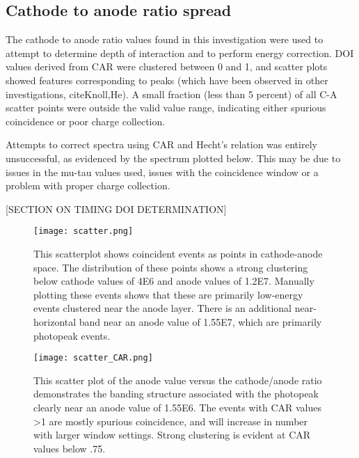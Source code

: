 \subsection{Cathode to anode ratio spread}

The cathode to anode ratio values found in this investigation were used to attempt to determine depth of interaction and to perform energy correction. DOI values derived from CAR were clustered between 0 and 1, and scatter plots showed features corresponding to peaks (which have been observed in other investigations, cite{Knoll,He}). A small fraction (less than 5 percent) of all C-A scatter points were outside the valid value range, indicating either spurious coincidence or poor charge collection. 

Attempts to correct spectra using CAR and Hecht's relation was entirely unsuccessful, as evidenced by the spectrum plotted below. This may be due to issues in the mu-tau values used, issues with the coincidence window or a problem with proper charge collection. 

[SECTION ON TIMING DOI DETERMINATION]


\begin{figure}[h!]
\begin{center}
\texttt{[image: scatter.png]}
\caption{This scatterplot shows coincident events as points in cathode-anode space. The distribution of these points shows a strong clustering below cathode values of 4E6 and anode values of 1.2E7. Manually plotting these events shows that these are primarily low-energy events clustered near the anode layer. There is an additional near-horizontal band near an anode value of 1.55E7, which are primarily photopeak events. }
\label{rt}
\end{center}
\end{figure}
\clearpage



\begin{figure}[h!]
\begin{center}
\texttt{[image: scatter\_CAR.png]}
\caption{This scatter plot of the anode value versus the cathode/anode ratio demonstrates the banding structure associated with the photopeak clearly near an anode value of 1.55E6. The events with CAR values >1 are mostly spurious coincidence, and will increase in number with larger window settings. Strong clustering is evident at CAR values below .75.}
\label{Ori}
\end{center}
\end{figure}




